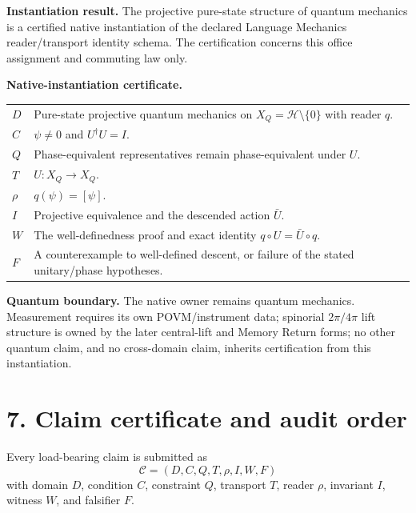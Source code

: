 \documentclass[10.5pt]{article}
\begin{document}
\begin{certbox}
\textbf{Instantiation result.} The projective pure-state structure of quantum mechanics is a certified native instantiation of the declared Language Mechanics reader/transport identity schema. The certification concerns this office assignment and commuting law only.
\end{certbox}

\textbf{Native-instantiation certificate.}
\begin{center}
\begin{tabularx}{0.96\textwidth}{>{\bfseries}p{}X}
\toprule
$D$ & Pure-state projective quantum mechanics on $X_Q=\mathcal H\setminus\{0\}$ with reader $q$.\\
$C$ & $\psi\neq0$ and $U^\dagger U=I$.\\
$Q$ & Phase-equivalent representatives remain phase-equivalent under $U$.\\
$T$ & $U:X_Q\to X_Q$.\\
$\rho$ & $q(\psi)=[\psi]$.\\
$I$ & Projective equivalence and the descended action $\bar U$.\\
$W$ & The well-definedness proof and exact identity $q\circ U=\bar U\circ q$.\\
$F$ & A counterexample to well-defined descent, or failure of the stated unitary/phase hypotheses.\\
\bottomrule
\end{tabularx}
\end{center}

\begin{boundarybox}
\textbf{Quantum boundary.} The native owner remains quantum mechanics. Measurement requires its own POVM/instrument data; spinorial $2\pi/4\pi$ lift structure is owned by the later central-lift and Memory Return forms; no other quantum claim, and no cross-domain claim, inherits certification from this instantiation.
\end{boundarybox}

\section*{7. Claim certificate and audit order}
Every load-bearing claim is submitted as
\[
\boxed{\mathcal C=(D,C,Q,T,\rho,I,W,F)}
\]
with domain $D$, condition $C$, constraint $Q$, transport $T$, reader $\rho$, invariant $I$, witness $W$, and falsifier $F$.
\end{document}
